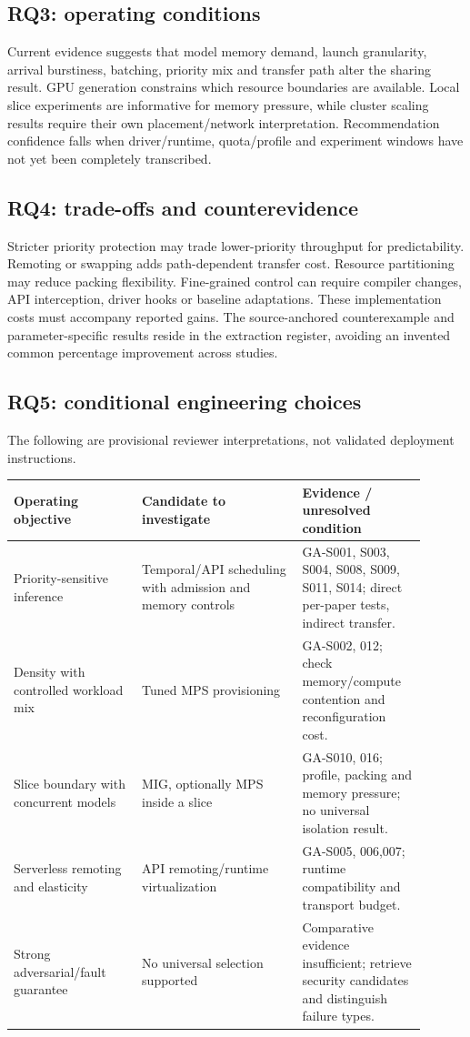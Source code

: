 \documentclass[12pt,a 4paper]{article}
\begin{document}
\subsection{RQ3: operating conditions}
Current evidence suggests that model memory demand, launch granularity, arrival burstiness, batching, priority mix and transfer path alter the sharing result. GPU generation constrains which resource boundaries are available. Local slice experiments are informative for memory pressure, while cluster scaling results require their own placement/network interpretation. Recommendation confidence falls when driver/runtime, quota/profile and experiment windows have not yet been completely transcribed.

\subsection{RQ4: trade-offs and counterevidence}
Stricter priority protection may trade lower-priority throughput for predictability. Remoting or swapping adds path-dependent transfer cost. Resource partitioning may reduce packing flexibility. Fine-grained control can require compiler changes, API interception, driver hooks or baseline adaptations. These implementation costs must accompany reported gains. The source-anchored counterexample and parameter-specific results reside in the extraction register, avoiding an invented common percentage improvement across studies.

\subsection{RQ5: conditional engineering choices}
The following are provisional reviewer interpretations, not validated deployment instructions.
\begin{longtable}{P{0.28\linewidth}P{0.35\linewidth}P{0.27\linewidth}}
\toprule Operating objective & Candidate to investigate & Evidence / unresolved condition\\\midrule\endhead
Priority-sensitive inference & Temporal/API scheduling with admission and memory controls &GA-S001,  S003,  S004,  S008,  S009,  S011,  S014; direct per-paper tests, indirect transfer.\\
Density with controlled workload mix & Tuned MPS provisioning &GA-S002, 012; check memory/compute contention and reconfiguration cost.\\
Slice boundary with concurrent models & MIG, optionally MPS inside a slice &GA-S010, 016; profile, packing and memory pressure; no universal isolation result.\\
Serverless remoting and elasticity & API remoting/runtime virtualization &GA-S005, 006,007; runtime compatibility and transport budget.\\
Strong adversarial/fault guarantee & No universal selection supported &Comparative evidence insufficient; retrieve security candidates and distinguish failure types.\\
\bottomrule\end{longtable}
\end{document}

